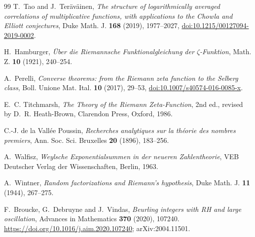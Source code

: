 \documentclass[11pt,reqno]{amsart}
\numberwithin{equation}{section}
\theoremstyle{plain}
\theoremstyle{definition}
\theoremstyle{remark}
\begin{document}
\begin{thebibliography}{99}
T.~Tao and J.~Ter\"av\"ainen, \emph{The structure of logarithmically averaged
correlations of multiplicative functions, with applications to the Chowla
and Elliott conjectures}, Duke Math. J. \textbf{168} (2019), 1977--2027,
\href{https://doi.org/10.1215/00127094-2019-0002}{doi:10.1215/00127094-2019-0002}.

H.~Hamburger, \emph{\"Uber die Riemannsche Funktionalgleichung der
$\zeta$-Funktion}, Math. Z. \textbf{10} (1921), 240--254.

A.~Perelli, \emph{Converse theorems: from the Riemann zeta function to the
Selberg class}, Boll. Unione Mat. Ital. \textbf{10} (2017), 29--53,
\href{https://doi.org/10.1007/s40574-016-0085-x}{doi:10.1007/s40574-016-0085-x}.

E.~C. Titchmarsh, \emph{The Theory of the Riemann Zeta-Function}, 2nd ed.,
revised by D.~R. Heath-Brown, Clarendon Press, Oxford, 1986.

C.-J. de la Vall\'ee Poussin, \emph{Recherches analytiques sur la th\'eorie
des nombres premiers}, Ann. Soc. Sci. Bruxelles \textbf{20} (1896), 183--256.

A.~Walfisz, \emph{Weylsche Exponentialsummen in der neueren Zahlentheorie},
VEB Deutscher Verlag der Wissenschaften, Berlin, 1963.

A.~Wintner, \emph{Random factorizations and Riemann's hypothesis}, Duke
Math. J. \textbf{11} (1944), 267--275.


F.~Broucke, G.~Debruyne and J.~Vindas,
\emph{Beurling integers with RH and large oscillation},
Advances in Mathematics \textbf{370} (2020), 107240.
\url{https://doi.org/10.1016/j.aim.2020.107240}; arXiv:2004.11501.

\end{thebibliography}
\end{document}
